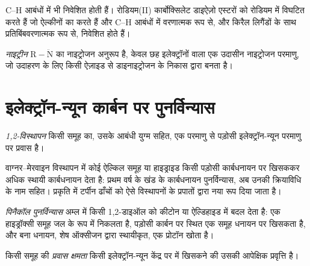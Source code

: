  C--H आबंधों में भी निवेशित होती हैं। रोडियम(II) कार्बोक्सिलेट
डाइऐज़ो एस्टरों को रोडियम  में विघटित करते हैं जो ऐल्कीनों का  करते हैं और
C--H आबंधों में वरणात्मक रूप से, और किरैल लिगैंडों के साथ प्रतिबिंबवरणात्मक रूप से, निवेशित होते हैं।

\begin{definition}[नाइट्रीन]\label{def:b3:radicals-carbenes:nitrene}
\emph{नाइट्रीन} $\mathrm{R{-}\ddot N}$  का नाइट्रोजन अनुरूप है, केवल छह इलेक्ट्रॉनों वाला
एक उदासीन नाइट्रोजन परमाणु, जो उदाहरण के लिए किसी ऐज़ाइड से डाइनाइट्रोजन के
निकास द्वारा बनता है।
\end{definition}

\section{इलेक्ट्रॉन-न्यून कार्बन पर पुनर्विन्यास}

\begin{definition}[1,2-विस्थापन]\label{def:b3:radicals-carbenes:shift}
\emph{1,2-विस्थापन} किसी समूह का, उसके आबंधी
युग्म सहित, एक परमाणु से पड़ोसी इलेक्ट्रॉन-न्यून परमाणु पर प्रवास है।
\end{definition}

वाग्नर--मेरवाइन विस्थापन में कोई ऐल्किल समूह या हाइड्राइड किसी पड़ोसी
कार्बधनायन पर खिसककर अधिक स्थायी कार्बधनायन देता है: प्रथम वर्ष के खंड के
कार्बधनायन पुनर्विन्यास, अब उनकी क्रियाविधि के नाम सहित। प्रकृति में टर्पीन ढाँचों को
ऐसे विस्थापनों के प्रपातों द्वारा नया रूप दिया जाता है।

\begin{definition}[पिनैकॉल पुनर्विन्यास]\label{def:b3:radicals-carbenes:pinacol}
\emph{पिनैकॉल पुनर्विन्यास} अम्ल में किसी 1,2-डाइऑल को
कीटोन या ऐल्डिहाइड में बदल देता है: एक हाइड्रॉक्सी समूह जल के रूप में निकलता है,
पड़ोसी कार्बन पर स्थित एक समूह धनायन पर खिसकता है, और बना धनायन,
शेष ऑक्सीजन द्वारा स्थायीकृत, एक प्रोटॉन खोता है।
\end{definition}

\begin{definition}[प्रवास क्षमता]\label{def:b3:radicals-carbenes:migratory}
किसी समूह की \emph{प्रवास क्षमता} किसी इलेक्ट्रॉन-न्यून केंद्र पर
 में खिसकने की उसकी आपेक्षिक प्रवृत्ति है।
\end{definition}

